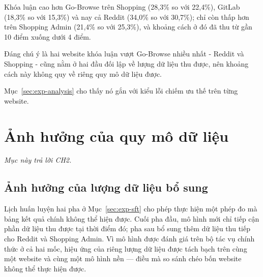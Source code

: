 Khóa luận cao hơn Go-Browse trên Shopping (28{,}3\% so với 22{,}4\%), GitLab (18{,}3\% so với 15{,}3\%) và nay cả Reddit (34{,}0\% so với 30{,}7\%); chỉ còn thấp hơn trên Shopping Admin (21{,}4\% so với 25{,}3\%), và khoảng cách ở đó đã thu từ gần 10 điểm xuống dưới 4 điểm.

Đáng chú ý là hai website khóa luận vượt Go-Browse nhiều nhất - Reddit và Shopping - cũng nằm ở hai đầu đối lập về lượng dữ liệu thu được, nên khoảng cách này không quy về riêng quy mô dữ liệu được.

Mục~\ref{sec:exp-analysis} cho thấy nó gắn với kiểu lỗi chiếm ưu thế trên từng website.

\section{Ảnh hưởng của quy mô dữ liệu}
\label{sec:exp-ablation}

\noindent\emph{Mục này trả lời CH2.}

\subsection{Ảnh hưởng của lượng dữ liệu bổ sung}
\label{sec:exp-datascale}

Lịch huấn luyện hai pha ở Mục~\ref{sec:exp-sft} cho phép thực hiện một phép đo mà bảng kết quả chính không thể hiện được. Cuối pha đầu, mô hình mới chỉ tiếp cận phần dữ liệu thu được tại thời điểm đó; pha sau bổ sung thêm dữ liệu thu tiếp cho Reddit và Shopping Admin. Vì mô hình được đánh giá trên bộ tác vụ chính thức ở cả hai mốc, hiệu ứng của riêng lượng dữ liệu được tách bạch trên cùng một website và cùng một mô hình nền — điều mà so sánh chéo bốn website không thể thực hiện được.

\begin{table}[htbp]
  \centering
  \caption[Hiệu ứng của việc bổ sung dữ liệu]{Hiệu ứng của việc bổ sung dữ liệu trên hai website được thu thập thêm. Shopping và GitLab không được thu thêm dữ liệu nên không có mặt trong bảng.}
  \label{tab:datascale}
\end{table}

